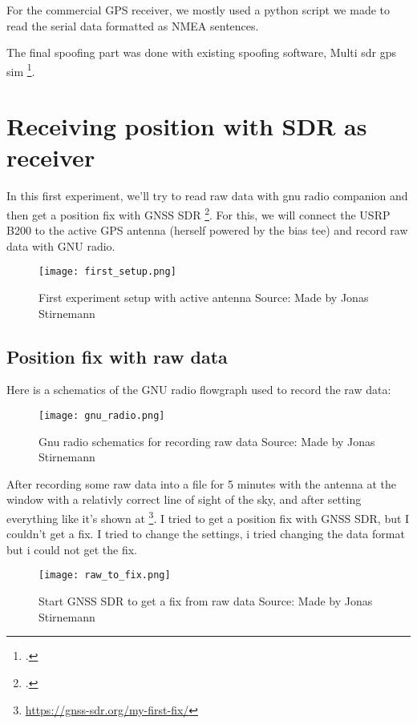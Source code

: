 For the commercial GPS receiver, we mostly used a python script we made to read the serial data formatted as NMEA sentences.

The final spoofing part was done with existing spoofing software, Multi sdr gps sim \footcite{mictronics_mictronicsmulti-sdr-gps-sim_2024}.

\section{Receiving position with SDR as receiver}

In this first experiment, we'll try to read raw data with gnu radio companion and then get a position fix with GNSS SDR \footcite{fernandez-prades_gnss-sdr_2024}.
For this, we will connect the USRP B200 to the active GPS antenna (herself powered by the bias tee) and record raw data with GNU radio.

\begin{figure}[H]
	\centering
	\texttt{[image: first\_setup.png]}
	\caption[First experiment setup]{First experiment setup with active antenna Source: Made by Jonas Stirnemann}
	\label{fig:first_setup}
\end{figure}


\subsection{Position fix with raw data}
Here is a schematics of the GNU radio flowgraph used to record the raw data:

\begin{figure}[H]
	\centering
	\texttt{[image: gnu\_radio.png]}
	\caption[Gnu radio schematics raw data]{Gnu radio schematics for recording raw data Source: Made by Jonas Stirnemann}
	\label{fig:gnu_radio}
\end{figure}

After recording some raw data into a file for 5 minutes with the antenna at the window with a relativly correct line of sight of the sky, and after setting everything like it's shown at \footnote{\url{https://gnss-sdr.org/my-first-fix/}}. I tried to get a position fix with GNSS SDR, but I couldn't get a fix. I tried to change the settings, i tried changing the data format but i could not get the fix.

\begin{figure}[H]
	\centering
	\texttt{[image: raw\_to\_fix.png]}
	\caption[Start GNSS SDR]{Start GNSS SDR to get a fix from raw data Source: Made by Jonas Stirnemann}
	\label{fig:start_raw}
\end{figure}

